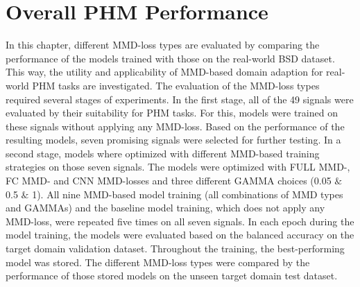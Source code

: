 \section{Overall PHM Performance}\label{ch:PHM_performance}
In this chapter, different MMD-loss types are evaluated by comparing the performance of the models trained with those on the real-world BSD dataset. This way, the utility and applicability of MMD-based domain adaption for real-world PHM tasks are investigated. The evaluation of the MMD-loss types required several stages of experiments.
In the first stage, all of the 49 signals were evaluated by their suitability for PHM tasks. For this, models were trained on these signals without applying any MMD-loss. Based on the performance of the resulting models, seven promising signals were selected for further testing. In a second stage, models where optimized with different MMD-based training strategies on those seven signals. The models were optimized with FULL MMD-, FC MMD- and CNN MMD-losses and three different GAMMA choices (0.05 $\&$ 0.5 $\&$ 1). All nine MMD-based model training (all combinations of MMD types and GAMMAs) and the baseline model training, which does not apply any MMD-loss, were repeated five times on all seven signals. In each epoch during the model training, the models were evaluated based on the balanced accuracy on the target domain validation dataset. Throughout the training, the best-performing model was stored. The different MMD-loss types were compared by the performance of those stored models on the unseen target domain test dataset.

